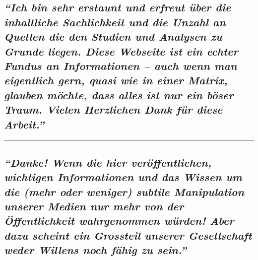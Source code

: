 \hypertarget{ich-bin-sehr-erstaunt-und-erfreut-uxfcber-die-inhaltliche-sachlichkeit-und-die-unzahl-an-quellen-die-den-studien-und-analysen-zu-grunde-liegen-diese-webseite-ist-ein-echter-fundus-an-informationen--auch-wenn-man-eigentlich-gern-quasi-wie-in-einer-matrix-glauben-muxf6chte-dass-alles-ist-nur-ein-buxf6ser-traum-vielen-herzlichen-dank-fuxfcr-diese-arbeit}{%
\subsection{\texorpdfstring{\emph{``Ich bin sehr erstaunt und erfreut
über die inhaltliche Sachlichkeit und die Unzahl an Quellen die den
Studien und Analysen zu Grunde liegen. Diese Webseite ist ein echter
Fundus an Informationen -- auch wenn man eigentlich gern, quasi wie in
einer Matrix, glauben möchte, dass alles ist nur ein böser Traum. Vielen
Herzlichen Dank für diese
Arbeit.''}}{``Ich bin sehr erstaunt und erfreut über die inhaltliche Sachlichkeit und die Unzahl an Quellen die den Studien und Analysen zu Grunde liegen. Diese Webseite ist ein echter Fundus an Informationen -- auch wenn man eigentlich gern, quasi wie in einer Matrix, glauben möchte, dass alles ist nur ein böser Traum. Vielen Herzlichen Dank für diese Arbeit.''}}\label{ich-bin-sehr-erstaunt-und-erfreut-uxfcber-die-inhaltliche-sachlichkeit-und-die-unzahl-an-quellen-die-den-studien-und-analysen-zu-grunde-liegen-diese-webseite-ist-ein-echter-fundus-an-informationen--auch-wenn-man-eigentlich-gern-quasi-wie-in-einer-matrix-glauben-muxf6chte-dass-alles-ist-nur-ein-buxf6ser-traum-vielen-herzlichen-dank-fuxfcr-diese-arbeit}}

\begin{center}\rule{0.5\linewidth}{\linethickness}\end{center}

\hypertarget{danke-wenn-die-hier-veruxf6ffentlichen-wichtigen-informationen-und-das-wissen-um-die-mehr-oder-weniger-subtile-manipulation-unserer-medien-nur-mehr-von-der-uxf6ffentlichkeit-wahrgenommen-wuxfcrden-aber-dazu-scheint-ein-grossteil-unserer-gesellschaft-weder-willens-noch-fuxe4hig-zu-sein}{%
\subsection{\texorpdfstring{\emph{``Danke! Wenn die hier
veröffentlichen, wichtigen Informationen und das Wissen um die (mehr
oder weniger) subtile Manipulation unserer Medien nur mehr von der
Öffentlichkeit wahrgenommen würden! Aber dazu scheint ein Grossteil
unserer Gesellschaft weder Willens noch fähig zu
sein.''}}{``Danke! Wenn die hier veröffentlichen, wichtigen Informationen und das Wissen um die (mehr oder weniger) subtile Manipulation unserer Medien nur mehr von der Öffentlichkeit wahrgenommen würden! Aber dazu scheint ein Grossteil unserer Gesellschaft weder Willens noch fähig zu sein.''}}\label{danke-wenn-die-hier-veruxf6ffentlichen-wichtigen-informationen-und-das-wissen-um-die-mehr-oder-weniger-subtile-manipulation-unserer-medien-nur-mehr-von-der-uxf6ffentlichkeit-wahrgenommen-wuxfcrden-aber-dazu-scheint-ein-grossteil-unserer-gesellschaft-weder-willens-noch-fuxe4hig-zu-sein}}

